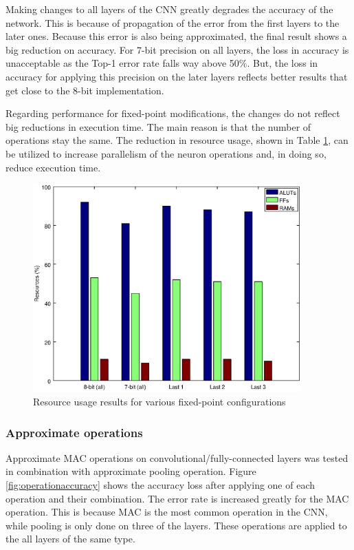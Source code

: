 \begin{enumerate}
Making changes to all layers of the CNN greatly degrades the accuracy of the network.
This is because of propagation of the error from the first layers to the later ones.
Because this error is also being approximated, the final result shows a big reduction 
on accuracy. For 7-bit precision on all layers, the loss in accuracy is unacceptable as
the Top-1 error rate falls way above 50\%. But, the loss in accuracy for applying 
this precision on the later layers reflects better results that get close to the 8-bit implementation.

Regarding performance for fixed-point modifications, the changes do not reflect big reductions
in execution time. The main reason is that the number of operations stay the same. The reduction
in resource usage, shown in Table \ref{fig:fpresource}, can be utilized to increase parallelism
of the neuron operations and, in doing so, reduce execution time.

\begin{figure}[H]
    \centering
    \includegraphics[height=8cm]{fig/fpresource.eps}
    \caption{Resource usage results for various fixed-point configurations}
    \label{fig:fpresource}
\end{figure}

\subsubsection{Approximate operations}

Approximate MAC operations on convolutional/fully-connected layers was tested in combination with
approximate pooling operation. Figure \ref{fig:operationaccuracy} shows the accuracy loss after
applying one of each operation and their combination.
The error rate is increased greatly for the MAC operation. This is because MAC is the most
common operation in the CNN, while pooling is only done on three of the layers.
These operations are applied to the all layers of the same type.


\end{enumerate}
